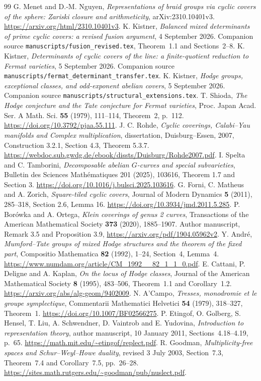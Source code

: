 \documentclass[11pt]{article}
\theoremstyle{definition}
\begin{document}
\begin{thebibliography}{99}
 G. Menet and D.-M. Nguyen,
\emph{Representations of braid groups via cyclic covers of the sphere:
Zariski closure and arithmeticity}, arXiv:2310.10401v3.
\url{https://arxiv.org/html/2310.10401v3}.
 K. Kistner, \emph{Balanced mixed determinants of prime
cyclic covers: a revised fusion argument}, 4 September 2026.
Companion source \texttt{manuscripts/fusion\_revised.tex},
Theorem~1.1 and Sections~2--8.
 K. Kistner, \emph{Determinants of cyclic covers of the line:
a finite-quotient reduction to Fermat varieties}, 5 September 2026.
Companion source \nolinkurl{manuscripts/fermat_determinant_transfer.tex}.
 K. Kistner, \emph{Hodge groups, exceptional classes,
and odd-exponent abelian covers},
5 September 2026. Companion source
\nolinkurl{manuscripts/structural_extensions.tex}.
 T. Shioda, \emph{The Hodge conjecture and the Tate
conjecture for Fermat varieties}, Proc. Japan Acad. Ser. A Math. Sci.
\textbf{55} (1979), 111--114, Theorem~2, p.~112.
\url{https://doi.org/10.3792/pjaa.55.111}.
 J. C. Rohde, \emph{Cyclic coverings, Calabi--Yau manifolds
and Complex multiplication}, dissertation, Duisburg--Essen, 2007,
Construction 3.2.1, Section 4.3, Theorem 5.3.7.
\url{https://webdoc.sub.gwdg.de/ebook/dissts/Duisburg/Rohde2007.pdf}.
 I. Spelta and C. Tamborini, \emph{Decomposable abelian
$G$-curves and special subvarieties}, Bulletin des Sciences Math\'ematiques
201 (2025), 103616, Theorem 1.7 and Section 3.
\url{https://doi.org/10.1016/j.bulsci.2025.103616}.
 G. Forni, C. Matheus and A. Zorich,
\emph{Square-tiled cyclic covers}, Journal of Modern Dynamics
\textbf{5} (2011), 285--318, Section 2.6, Lemma 16.
\url{https://doi.org/10.3934/jmd.2011.5.285}.
 P. Bor\'owka and A. Ortega, \emph{Klein coverings of genus 2
curves}, Transactions of the American Mathematical Society
\textbf{373} (2020), 1885--1907. Author manuscript, Remark 3.5 and
Proposition 3.9, \url{https://arxiv.org/pdf/1904.05962v2}.
 Y. Andr\'e, \emph{Mumford--Tate groups of mixed Hodge
structures and the theorem of the fixed part}, Compositio Mathematica
\textbf{82} (1992), 1--24, Section~4, Lemma~4.
\url{https://www.numdam.org/article/CM_1992__82_1_1_0.pdf}.
 E. Cattani, P. Deligne and A. Kaplan,
\emph{On the locus of Hodge classes}, Journal of the American Mathematical
Society \textbf{8} (1995), 483--506, Theorem~1.1 and Corollary~1.2.
\url{https://arxiv.org/abs/alg-geom/9402009}.
 N. A'Campo, \emph{Tresses, monodromie et le groupe
symplectique}, Commentarii Mathematici Helvetici \textbf{54} (1979),
318--327, Theorem~1.
\url{https://doi.org/10.1007/BF02566275}.
 P. Etingof, O. Golberg, S. Hensel, T. Liu, A. Schwendner,
D. Vaintrob and E. Yudovina, \emph{Introduction to representation theory},
author manuscript, 10 January 2011, Sections~4.18--4.19, p.~65.
\url{https://math.mit.edu/~etingof/replect.pdf}.
 R. Goodman, \emph{Multiplicity-free spaces and
Schur--Weyl--Howe duality}, revised 3 July 2003, Section~7.3,
Theorem~7.4 and Corollary~7.5, pp.~26--28.
\url{https://sites.math.rutgers.edu/~goodman/pub/nuslect.pdf}.
\end{thebibliography}
\end{document}
